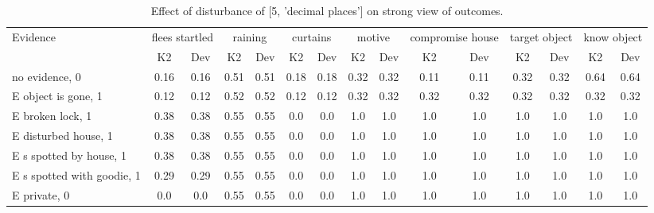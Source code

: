 \begin{table}\begin{tabular}{l|cc|cc|cc|cc|cc|cc|cc}\toprule\multirow{2}{*}{Evidence} & \multicolumn{2}{c}{flees startled}& \multicolumn{2}{c}{raining}& \multicolumn{2}{c}{curtains}& \multicolumn{2}{c}{motive}& \multicolumn{2}{c}{compromise house}& \multicolumn{2}{c}{target object}& \multicolumn{2}{c}{know object}\\& {K2} & {Dev}& {K2} & {Dev}& {K2} & {Dev}& {K2} & {Dev}& {K2} & {Dev}& {K2} & {Dev}& {K2} & {Dev}\\\midrule
no evidence, 0 & 0.16&0.16&0.51&0.51&0.18&0.18&0.32&0.32&0.11&0.11&0.32&0.32&0.64&0.64\\E object is gone, 1 & 0.12&0.12&0.52&0.52&0.12&0.12&0.32&0.32&0.32&0.32&0.32&0.32&0.32&0.32\\E broken lock, 1 & 0.38&0.38&0.55&0.55&0.0&0.0&1.0&1.0&1.0&1.0&1.0&1.0&1.0&1.0\\E disturbed house, 1 & 0.38&0.38&0.55&0.55&0.0&0.0&1.0&1.0&1.0&1.0&1.0&1.0&1.0&1.0\\E s spotted by house, 1 & 0.38&0.38&0.55&0.55&0.0&0.0&1.0&1.0&1.0&1.0&1.0&1.0&1.0&1.0\\E s spotted with goodie, 1 & 0.29&0.29&0.55&0.55&0.0&0.0&1.0&1.0&1.0&1.0&1.0&1.0&1.0&1.0\\E private, 0 & 0.0&0.0&0.55&0.55&0.0&0.0&1.0&1.0&1.0&1.0&1.0&1.0&1.0&1.0\\\bottomrule\end{tabular}\caption{Effect of disturbance of [5, 'decimal places'] on strong view of outcomes.}\end{table}